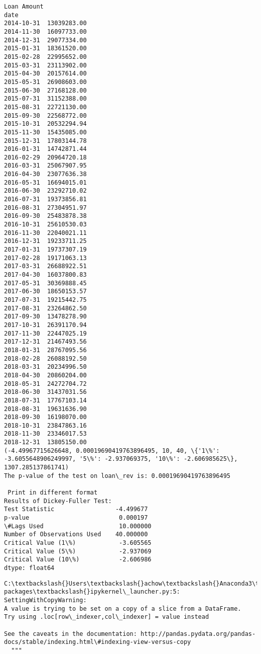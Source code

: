\documentclass[11pt]{article}
\begin{document}
    \begin{Verbatim}[commandchars=\\\{\}]
            Loan Amount
date                   
2014-10-31  13039283.00
2014-11-30  16097733.00
2014-12-31  29077334.00
2015-01-31  18361520.00
2015-02-28  22995652.00
2015-03-31  23113902.00
2015-04-30  20157614.00
2015-05-31  26908603.00
2015-06-30  27168128.00
2015-07-31  31152388.00
2015-08-31  22721130.00
2015-09-30  22568772.00
2015-10-31  20532294.94
2015-11-30  15435085.00
2015-12-31  17803144.78
2016-01-31  14742871.44
2016-02-29  20964720.18
2016-03-31  25067907.95
2016-04-30  23077636.38
2016-05-31  16694015.01
2016-06-30  23292710.02
2016-07-31  19373856.81
2016-08-31  27304951.97
2016-09-30  25483878.38
2016-10-31  25610530.03
2016-11-30  22040021.11
2016-12-31  19233711.25
2017-01-31  19737307.19
2017-02-28  19171063.13
2017-03-31  26688922.51
2017-04-30  16037800.83
2017-05-31  30369888.45
2017-06-30  18650153.57
2017-07-31  19215442.75
2017-08-31  23264862.50
2017-09-30  13478278.90
2017-10-31  26391170.94
2017-11-30  22447025.19
2017-12-31  21467493.56
2018-01-31  28767095.56
2018-02-28  26088192.50
2018-03-31  20234996.50
2018-04-30  20860204.00
2018-05-31  24272704.72
2018-06-30  31437031.56
2018-07-31  17767103.14
2018-08-31  19631636.90
2018-09-30  16198070.00
2018-10-31  23847863.16
2018-11-30  23346017.53
2018-12-31  13805150.00
(-4.49967715626648, 0.00019690419763896495, 10, 40, \{'1\%': -3.6055648906249997, '5\%': -2.937069375, '10\%': -2.606985625\}, 1307.285137861741)
The p-value of the test on loan\_rev is: 0.00019690419763896495

 Print in different format
Results of Dickey-Fuller Test:
Test Statistic                 -4.499677
p-value                         0.000197
\#Lags Used                     10.000000
Number of Observations Used    40.000000
Critical Value (1\%)            -3.605565
Critical Value (5\%)            -2.937069
Critical Value (10\%)           -2.606986
dtype: float64

    \end{Verbatim}

    \begin{Verbatim}[commandchars=\\\{\}]
C:\textbackslash{}Users\textbackslash{}achow\textbackslash{}Anaconda3\textbackslash{}lib\textbackslash{}site-packages\textbackslash{}ipykernel\_launcher.py:5: SettingWithCopyWarning: 
A value is trying to be set on a copy of a slice from a DataFrame.
Try using .loc[row\_indexer,col\_indexer] = value instead

See the caveats in the documentation: http://pandas.pydata.org/pandas-docs/stable/indexing.html\#indexing-view-versus-copy
  """

    \end{Verbatim}
\end{document}
